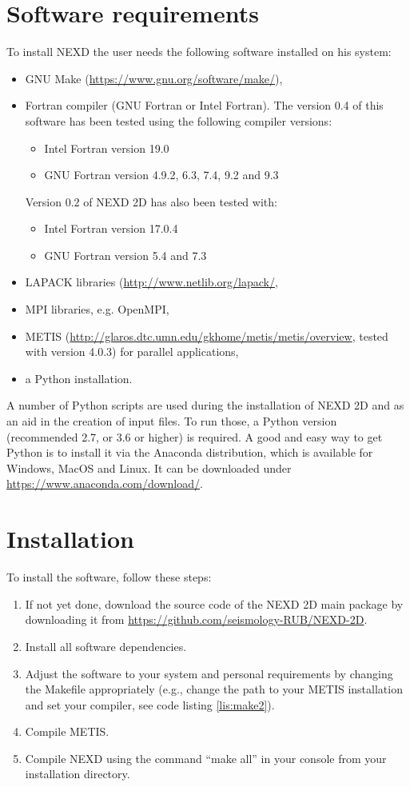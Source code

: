 \section{Software requirements}
\label{sec:softreq}
To install NEXD the user needs the following software installed on his system:
\begin{itemize}
    \item GNU Make (\url{https://www.gnu.org/software/make/}),
    \item Fortran compiler (GNU Fortran or Intel Fortran). The version 0.4 of this software has been tested using the following compiler versions:
		\begin{itemize}
			\item Intel Fortran version 19.0
			\item GNU Fortran version 4.9.2, 6.3, 7.4, 9.2 and 9.3
		\end{itemize}
	Version 0.2 of NEXD 2D has also been tested with:
		\begin{itemize}
			\item Intel Fortran version 17.0.4
			\item GNU Fortran version 5.4 and 7.3
		\end{itemize}	
    \item LAPACK libraries (\url{http://www.netlib.org/lapack/},
    \item MPI libraries, e.g. OpenMPI, 
    \item METIS (\url{http://glaros.dtc.umn.edu/gkhome/metis/metis/overview}, tested with version 4.0.3) for parallel applications,
    \item a Python installation.
\end{itemize}
 
A number of Python scripts are used during the installation of NEXD 2D and as an aid in the creation of input files. To run those, a Python version (recommended 2.7, or 3.6 or higher) is required. A good and easy way to get Python is to install it via the Anaconda distribution, which is available for Windows, MacOS and Linux. It can be downloaded under \url{https://www.anaconda.com/download/}.

\section{Installation}
To install the software, follow these steps:
\begin{enumerate}
    \item If not yet done, download the source code of the NEXD 2D main package by downloading it from \url{https://github.com/seismology-RUB/NEXD-2D}.
    \item Install all software dependencies.
    \item Adjust the software to your system and personal requirements by changing the Makefile appropriately (e.g., change the path to your METIS installation and set your compiler, see code listing \ref{lis:make2}).
    \item Compile METIS.
    \item Compile NEXD using the command ``make all'' in your console from your installation directory.
\end{enumerate}

